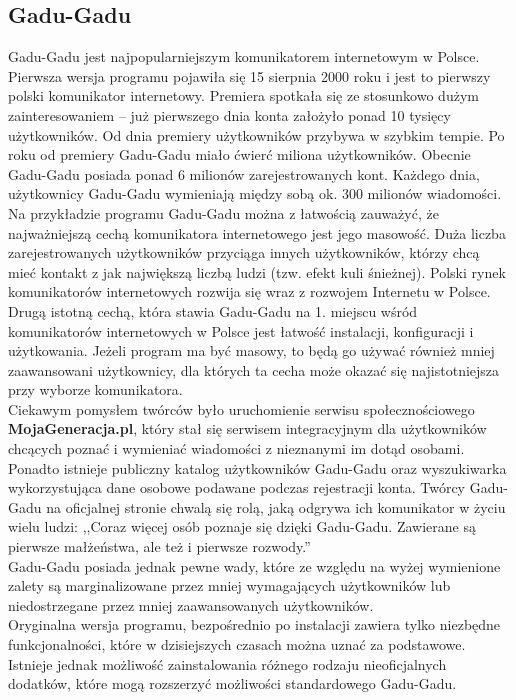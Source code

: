 \documentclass[a4paper,12pt]{article}
\begin{document}
\subsection[Gadu-Gadu]{Gadu-Gadu}
Gadu-Gadu jest najpopularniejszym komunikatorem internetowym w Polsce. Pierwsza wersja programu pojawiła się 15 sierpnia 2000 roku i jest to pierwszy polski komunikator internetowy. Premiera spotkała się ze stosunkowo dużym zainteresowaniem -- już pierwszego dnia konta założyło ponad 10 tysięcy użytkowników. Od dnia premiery użytkowników przybywa w szybkim tempie. Po roku od premiery Gadu-Gadu miało ćwierć miliona użytkowników.
Obecnie Gadu-Gadu posiada ponad 6 milionów zarejestrowanych kont. Każdego dnia, użytkownicy Gadu-Gadu wymieniają między sobą ok. 300 milionów wiadomości.\\
Na przykładzie programu Gadu-Gadu można z łatwością zauważyć, że najważniejszą cechą komunikatora internetowego jest jego masowość. Duża liczba zarejestrowanych użytkowników przyciąga innych użytkowników, którzy chcą mieć kontakt z jak największą liczbą ludzi (tzw. efekt kuli śnieżnej). Polski rynek komunikatorów internetowych rozwija się wraz z rozwojem Internetu w Polsce.\\
Drugą istotną cechą, która stawia Gadu-Gadu na 1. miejscu wśród komunikatorów internetowych w Polsce jest łatwość instalacji, konfiguracji i użytkowania. Jeżeli program ma być masowy, to będą go używać również mniej zaawansowani użytkownicy, dla których ta cecha może okazać się najistotniejsza przy wyborze komunikatora.\\
Ciekawym pomysłem twórców było uruchomienie serwisu społecznościowego \textbf{MojaGeneracja.pl}, który stał się serwisem integracyjnym dla użytkowników chcących poznać i wymieniać wiadomości z nieznanymi im dotąd osobami. Ponadto istnieje publiczny katalog użytkowników Gadu-Gadu oraz wyszukiwarka wykorzystująca dane osobowe podawane podczas rejestracji konta. Twórcy Gadu-Gadu na oficjalnej stronie chwalą się rolą, jaką odgrywa ich komunikator w życiu wielu ludzi:
,,Coraz więcej osób poznaje się dzięki Gadu-Gadu. Zawierane są pierwsze małżeństwa, ale też i pierwsze rozwody.''\cite{GG}\\
Gadu-Gadu posiada jednak pewne wady, które ze względu na wyżej wymienione zalety są marginalizowane przez mniej wymagających użytkowników lub niedostrzegane przez mniej zaawansowanych użytkowników.\\
Oryginalna wersja programu, bezpośrednio po instalacji zawiera tylko niezbędne funkcjonalności, które w dzisiejszych czasach można uznać za podstawowe. Istnieje jednak możliwość zainstalowania różnego rodzaju nieoficjalnych dodatków, które mogą rozszerzyć możliwości standardowego Gadu-Gadu.\\
\end{document}

